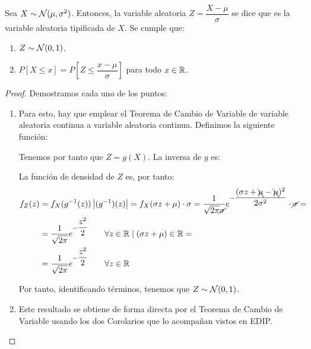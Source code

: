 \begin{teo}
    Sea $X\sim \mathcal{N}(\mu,\sigma^2)$. Entonces, la variable aleatoria $Z = \dfrac{X-\mu}{\sigma}$ se dice que es la variable aleatoria tipificada de $X$.
    Se cumple que:
    \begin{enumerate}
        \item $Z\sim \mathcal{N}(0,1)$.
        \item $P[X\leq x] = P\left[Z\leq \dfrac{x-\mu}{\sigma}\right]$ para todo $x\in \mathbb{R}$.
    \end{enumerate}
\end{teo}
\begin{proof}
    Demostramos cada uno de los puntos:
    \begin{enumerate}
        \item Para esto, hay que emplear el Teorema de Cambio de Variable de
        variable aleatoria continua a variable aleatoria continua. Definimos la siguiente función:

        Tenemos por tanto que $Z=g(X)$. La inversa de $g$ es:

        La función de densidad de $Z$ es, por tanto:
        \begin{align*}
            f_Z(z) &= f_X(g^{-1}(z))\left|(g^{-1})(z)\right| = f_X(\sigma z + \mu)\cdot \sigma = \dfrac{1}{\sqrt{2\pi}\cancel{\sigma}}e^{-\dfrac{(\sigma z+\bcancel{\mu} -\bcancel{\mu})^2}{2\sigma^2}} \cdot \cancel{\sigma} =\\&= \dfrac{1}{\sqrt{2\pi}}e^{-\dfrac{z^2}{2}}
            \qquad \forall z\in \mathbb{R}\mid (\sigma z + \mu)\in \mathbb{R}
            =\\&= \dfrac{1}{\sqrt{2\pi}}e^{-\dfrac{z^2}{2}}
            \qquad \forall z\in \mathbb{R}
        \end{align*}

        Por tanto, identificando términos, tenemos que $Z\sim \mathcal{N}(0,1)$.

        \item Este resultado se obtiene de forma directa por el Teorema de Cambio de Variable usando los dos Corolarios que lo acompañan vistos en EDIP.
        \begin{comment}
        Para demostrar esto, tenemos que:
        \begin{align*}
            P[X\leq x] &= \int_{-\infty}^{x} f_X(t)~dt = \int_{-\infty}^{x} \dfrac{1}{\sqrt{2\pi}\sigma} e^{-\dfrac{(t-\mu)^2}{2\sigma^2}}~dt \\
            P\left[Z\leq \dfrac{x-\mu}{\sigma}\right] &= \int_{-\infty}^{\frac{x-\mu}{\sigma}} f_Z(t)~dt = \int_{-\infty}^{\frac{x-\mu}{\sigma}} \dfrac{1}{\sqrt{2\pi}} e^{-\dfrac{t^2}{2}}~dt
        \end{align*}


\end{comment}
\end{enumerate}
\end{proof}
